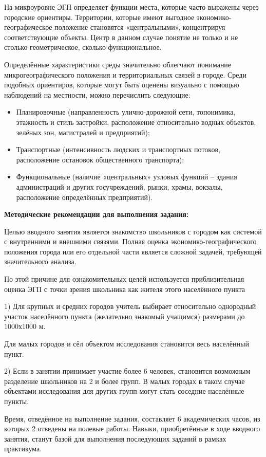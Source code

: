 \documentclass[
  11pt,
  russian,
]{book}
\begin{document}
На микроуровне ЭГП определяет функции места, которые часто выражены через городские ориентиры. Территории, которые имеют выгодное экономико-географическое положение становятся «центральными», концентрируя соответствующие объекты. Центр в данном случае понятие не только и не столько геометрическое, сколько функциональное.

Определённые характеристики среды значительно облегчают понимание микрогеографического положения и территориальных связей в городе. Среди подобных ориентиров, которые могут быть оценены визуально с помощью наблюдений на местности, можно перечислить следующие:

\begin{itemize}
\item
  Планировочные (направленность улично-дорожной сети, топонимика, этажность и стиль застройки, расположение относительно водных объектов, зелёных зон, магистралей и предприятий);
\item
  Транспортные (интенсивность людских и транспортных потоков, расположение остановок общественного транспорта);
\item
  Функциональные (наличие «центральных» узловых функций -- здания администраций и других госучреждений, рынки, храмы, вокзалы, расположение определённых предприятий).
\end{itemize}

\textbf{Методические рекомендации для выполнения задания:}

Целью вводного занятия является знакомство школьников с городом как системой с внутренними и внешними связями. Полная оценка экономико-географического положения города или его отдельной части является сложной задачей, требующей значительного анализа.

По этой причине для ознакомительных целей используется приблизительная оценка ЭГП с точки зрения школьника как жителя этого населённого пункта

1) Для крупных и средних городов учитель выбирает относительно однородный участок населённого пункта (желательно знакомый учащимся) размерами до 1000х1000 м.

Для малых городов и сёл объектом исследования становится весь населённый пункт.

2) Если в занятии принимает участие более 6 человек, становится возможным разделение школьников на 2 и более групп. В малых городах в таком случае объектами исследования для других групп могут стать соседние населённые пункты.

Время, отведённое на выполнение задания, составляет 6 академических часов, из которых 2 отведены на полевые работы. Навыки, приобретённые в ходе вводного занятия, станут базой для выполнения последующих заданий в рамках практикума.
\end{document}

